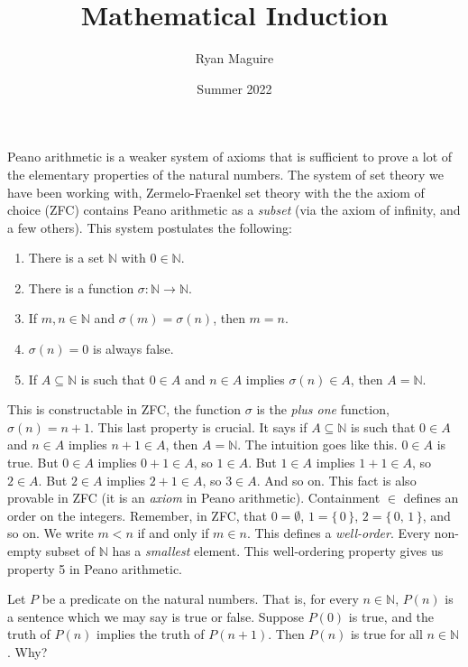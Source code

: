 \documentclass{article}
\title{Mathematical Induction}
\author{Ryan Maguire}
\date{Summer 2022}
\theoremstyle{plain}
\theoremstyle{normal}
\begin{document}
    \maketitle
    Peano arithmetic is a weaker system of axioms that is sufficient to prove a
    lot of the elementary properties of the natural numbers. The system of
    set theory we have been working with, Zermelo-Fraenkel set theory with the
    the axiom of choice (ZFC) contains Peano arithmetic as a \textit{subset}
    (via the axiom of infinity, and a few others). This system postulates the
    following:
    \begin{enumerate}
        \item There is a set $\mathbb{N}$ with $0\in\mathbb{N}$.
        \item There is a function $\sigma:\mathbb{N}\rightarrow\mathbb{N}$.
        \item If $m,n\in\mathbb{N}$ and $\sigma(m)=\sigma(n)$, then $m=n$.
        \item $\sigma(n)=0$ is always false.
        \item If $A\subseteq\mathbb{N}$ is such that $0\in{A}$ and
            $n\in{A}$ implies $\sigma(n)\in{A}$, then $A=\mathbb{N}$.
    \end{enumerate}
    This is constructable in ZFC, the function $\sigma$ is the
    \textit{plus one} function, $\sigma(n)=n+1$. This last property is
    crucial. It says if $A\subseteq\mathbb{N}$ is such that
    $0\in{A}$ and $n\in{A}$ implies $n+1\in{A}$, then $A=\mathbb{N}$. The
    intuition goes like this. $0\in{A}$ is true. But $0\in{A}$ implies
    $0+1\in{A}$, so $1\in{A}$. But $1\in{A}$ implies $1+1\in{A}$, so
    $2\in{A}$. But $2\in{A}$ implies $2+1\in{A}$, so $3\in{A}$. And so on.
    This fact is also provable in ZFC (it is an \textit{axiom} in Peano
    arithmetic). Containment $\in$ defines an order on the integers.
    Remember, in ZFC, that $0=\emptyset$, $1=\{\,0\,\}$,
    $2=\{\,0,\,1\,\}$, and so on. We write $m<n$ if and only if $m\in{n}$.
    This defines a \textit{well-order}. Every non-empty subset of $\mathbb{N}$
    has a \textit{smallest} element. This well-ordering property gives us
    property 5 in Peano arithmetic.
    \par\hfill\par
    Let $P$ be a predicate on the natural numbers. That is,
    for every $n\in\mathbb{N}$, $P(n)$ is a sentence which we may say is
    true or false. Suppose $P(0)$ is true, and the truth of $P(n)$ implies
    the truth of $P(n+1)$. Then $P(n)$ is true for all $n\in\mathbb{N}$. Why?
\end{document}

